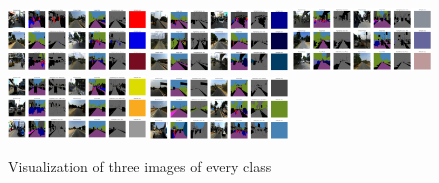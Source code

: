\documentclass[10pt]{article}
\begin{document}
\begin{enumerate}[label=(\alph*)]
\begin{figure}[h!]
            \includegraphics[width=0.325\textwidth]{Assets/Segmentation/Original/03}
            \includegraphics[width=0.325\textwidth]{Assets/Segmentation/Original/04}
            \includegraphics[width=0.325\textwidth]{Assets/Segmentation/Original/05}
            \includegraphics[width=0.325\textwidth]{Assets/Segmentation/Original/06}
            \includegraphics[width=0.325\textwidth]{Assets/Segmentation/Original/07}
            \caption{Visualization of three images of every class}
            \label{fig:masks}
        \end{figure}
    \end{enumerate}
\end{document}
